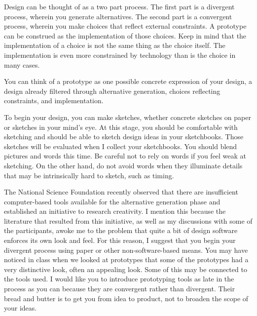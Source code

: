 \hypertarget{design-as-an-input-to-a-prototype}{%
\label{design-as-an-input-to-a-prototype}}

Design can be thought of as a two part process. The first part is a
divergent process, wherein you generate alternatives. The second part is
a convergent process, wherein you make choices that reflect external
constraints. A prototype can be construed as the implementation of those
choices. Keep in mind that the implementation of a choice is not the
same thing as the choice itself. The implementation is even more
constrained by technology than is the choice in many cases.

You can think of a prototype as one possible concrete expression of your
design, a design already filtered through alternative generation,
choices reflecting constraints, and implementation.

\hypertarget{alternative-generation}{%
\label{alternative-generation}}

To begin your design, you can make sketches, whether concrete sketches
on paper or sketches in your mind's eye. At this stage, you should be
comfortable with sketching and should be able to sketch design ideas in
your sketchbooks. Those sketches will be evaluated when I collect your
sketchbooks. You should blend pictures and words this time. Be careful
not to rely on words if you feel weak at sketching. On the other hand,
do not avoid words when they illuminate details that may be
intrinsically hard to sketch, such as timing.

The National Science Foundation recently observed that there are
insufficient computer-based tools available for the alternative
generation phase and established an initiative to research creativity. I
mention this because the literature that resulted from this initiative,
as well as my discussions with some of the participants, awoke me to the
problem that quite a bit of design software enforces its own look and
feel. For this reason, I suggest that you begin your divergent process
using paper or other non-software-based means. You may have noticed in
class when we looked at prototypes that some of the prototypes had a
very distinctive look, often an appealing look. Some of this may be
connected to the tools used. I would like you to introduce prototyping
tools as late in the process as you can because they are convergent
rather than divergent. Their bread and butter is to get you from idea to
product, not to broaden the scope of your ideas.

